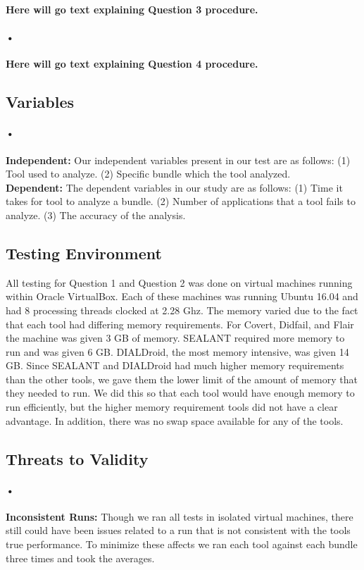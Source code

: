 \documentclass[twocolumn]{article}
\begin{document}
	\textbf{Here will go text explaining Question 3 procedure.}
\paragraph{•}
	\textbf{Here will go text explaining Question 4 procedure.}

\subsection{Variables}
\paragraph{•}
	\textbf{Independent:} Our independent variables present in our test are as follows: (1) Tool used to analyze. (2) Specific bundle which the tool analyzed.\\
	\textbf{Dependent:} The dependent variables in our study are as follows: (1) Time it takes for tool to analyze a bundle. (2) Number of applications that a tool fails to analyze. (3) The accuracy of the analysis.
	
\subsection{Testing Environment}
	All testing for Question 1 and Question 2 was done on virtual machines running within Oracle VirtualBox. Each of these machines was running Ubuntu 16.04 and had 8 processing threads clocked at 2.28 Ghz. The memory varied due to the fact that each tool had differing memory requirements. For Covert, Didfail, and Flair the machine was given 3 GB of memory. SEALANT required more memory to run and was given 6 GB. DIALDroid, the most memory intensive, was given 14 GB. Since SEALANT and DIALDroid had much higher memory requirements than the other tools, we gave them the lower limit of the amount of memory that they needed to run. We did this so that each tool would have enough memory to run efficiently, but the higher memory requirement tools did not have a clear advantage. In addition, there was no swap space available for any of the tools.
	
\subsection{Threats to Validity}
\paragraph{•}
	\textbf{Inconsistent Runs:} Though we ran all tests in isolated virtual machines, there still could have been issues related to a run that is not consistent with the tools true performance. To minimize these affects we ran each tool against each bundle three times and took the averages.
\end{document}
